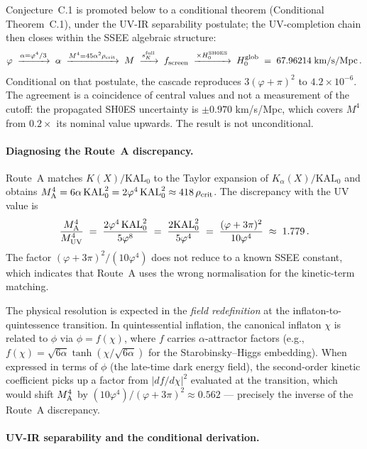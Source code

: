 \documentclass[12pt,a4paper]{article}
\newcommand{\phiG}{\varphi}
\newcommand{\KAL}{\mathrm{KAL}_0}
\newcommand{\fsc}{f_{\mathrm{screen}}}
\newcommand{\sK}{s_K}
\newcommand{\rhoc}{\rho_{\rm crit}}
\begin{document}
\medskip
Conjecture~C.1 is promoted below to a conditional theorem (Conditional
Theorem~C.1), under the UV-IR separability postulate; the UV-completion chain
then closes within the SSEE algebraic structure:
\begin{equation}
  \phiG \;\xrightarrow{\alpha = \phiG^4/3}\; \alpha
        \;\xrightarrow{M^4 = 45\alpha^2\rhoc}\; M
        \;\xrightarrow{\sK^{\rm full}}\; \fsc
        \;\xrightarrow{\times H_0^{\rm SH0ES}}\; H_0^{\rm glob}
  \;=\; 67.96214\;\text{km/s/Mpc}\,.
\end{equation}
Conditional on that postulate, the cascade reproduces $3(\phiG+\pi)^2$ to
$4.2\times10^{-6}$. The agreement is a coincidence of central values and not a
measurement of the cutoff: the propagated SH0ES uncertainty is $\pm0.970$
km/s/Mpc, which covers $M^4$ from $0.2\times$ its nominal value upwards. The
result is not unconditional.

\paragraph{Diagnosing the Route~A discrepancy.}
Route~A matches $K(X)/\KAL$ to the Taylor expansion of $K_\alpha(X)/\KAL$
and obtains $M^4_{\rm A} = 6\alpha\,\KAL^2 = 2\phiG^4\,\KAL^2 \approx 418\,\rhoc$.
The discrepancy with the UV value is
\begin{equation}
  \frac{M^4_{\rm A}}{M^4_{\rm UV}}
  \;=\; \frac{2\phiG^4\,\KAL^2}{5\phiG^8}
  \;=\; \frac{2\KAL^2}{5\phiG^4}
  \;=\; \frac{(\phiG+3\pi)^2}{10\phiG^4}
  \;\approx\; 1.779\,.
  \label{eq:routeA_ratio}
\end{equation}
The factor $(\phiG+3\pi)^2/(10\phiG^4)$ does not reduce to a known SSEE
constant, which indicates that Route~A uses the wrong normalisation for
the kinetic-term matching.

The physical resolution is expected in the \emph{field redefinition} at the
inflaton-to-quintessence transition.
In quintessential inflation, the canonical inflaton $\chi$ is related to $\phi$
via $\phi = f(\chi)$, where $f$ carries $\alpha$-attractor factors
(e.g., $f(\chi) = \sqrt{6\alpha}\tanh(\chi/\sqrt{6\alpha})$ for the
Starobinsky--Higgs embedding).
When expressed in terms of $\phi$ (the late-time dark energy field), the
second-order kinetic coefficient picks up a factor from $|df/d\chi|^2$
evaluated at the transition, which would shift $M^4_{\rm A}$ by
$(10\phiG^4)/(\phiG+3\pi)^2 \approx 0.562$ --- precisely the inverse of
the Route~A discrepancy.

\paragraph{UV-IR separability and the conditional derivation.}
\end{document}
